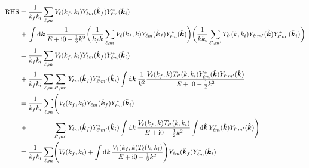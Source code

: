 \documentclass{article}
\begin{document}
\begin{alignat*}{2}
  \mathrm{RHS}
  {}={}
  &
  \dfrac{1}{k_{f} k_{i}}
  \sum_{\ell, m}
  V_{\ell}\lr{k_{f}, k_{i}}
  Y_{\ell m}\lr{\hat{\boldsymbol{k}}_{f}}
  Y_{\ell m}^{*}\lr{\hat{\boldsymbol{k}}_{i}}
  \\
  {}+{}
  &
  \int
  \dd{\boldsymbol{k}}
  \dfrac
  {
    1
  }
  {
    E
    +
    \imath 0
    -
    \tfrac{1}{2}
    k^{2}
  }
  \lr[\bigg]
  {
    \dfrac{1}{k_{f} k}
    \sum_{\ell, m}
    V_{\ell}\lr{k_{f}, k}
    Y_{\ell m}\lr{\hat{\boldsymbol{k}}_{f}}
    Y_{\ell m}^{*}\lr{\hat{\boldsymbol{k}}}
  }
  \lr[\bigg]
  {
    \dfrac{1}{k k_{i}}
    \sum_{\ell', m'}
    T_{\ell'}\lr{k, k_{i}}
    Y_{\ell' m'}\lr{\hat{\boldsymbol{k}}}
    Y_{\ell' m'}^{*}\lr{\hat{\boldsymbol{k}}_{i}}
  }
  \\
  {}={}
  &
  \dfrac{1}{k_{f} k_{i}}
  \sum_{\ell, m}
  V_{\ell}\lr{k_{f}, k_{i}}
  Y_{\ell m}\lr{\hat{\boldsymbol{k}}_{f}}
  Y_{\ell m}^{*}\lr{\hat{\boldsymbol{k}}_{i}}
  \\
  {}+{}
  &
  \dfrac{1}{k_{f} k_{i}}
  \sum_{\ell, m}
  \sum_{\ell', m'}
  Y_{\ell m}\lr{\hat{\boldsymbol{k}}_{f}}
  Y_{\ell' m'}^{*}\lr{\hat{\boldsymbol{k}}_{i}}
  \int
  \dd{\boldsymbol{k}}
  \dfrac{1}{k^{2}}
  \dfrac
  {
    V_{\ell}\lr{k_{f}, k}
    T_{\ell'}\lr{k, k_{i}}
    Y_{\ell m}^{*}\lr{\hat{\boldsymbol{k}}}
    Y_{\ell' m'}\lr{\hat{\boldsymbol{k}}}
  }
  {
    E
    +
    \imath 0
    -
    \tfrac{1}{2}
    k^{2}
  }
  \\
  {}={}
  &
  \dfrac{1}{k_{f} k_{i}}
  \sum_{\ell, m}
  \lr[\Bigg]
  {
    V_{\ell}\lr{k_{f}, k_{i}}
    Y_{\ell m}\lr{\hat{\boldsymbol{k}}_{f}}
    Y_{\ell m}^{*}\lr{\hat{\boldsymbol{k}}_{i}}
    \\
    {}+{}
    &
    \phantom
    {
      \dfrac{1}{k_{f} k_{i}}
      \sum_{\ell, m}
    }
    \sum_{\ell', m'}
    Y_{\ell m}\lr{\hat{\boldsymbol{k}}_{f}}
    Y_{\ell' m'}^{*}\lr{\hat{\boldsymbol{k}}_{i}}
    \int
    \dd{k}
    \dfrac
    {
      V_{\ell}\lr{k_{f}, k}
      T_{\ell'}\lr{k, k_{i}}
    }
    {
      E
      +
      \imath 0
      -
      \tfrac{1}{2}
      k^{2}
    }
    \int
    \dd{\hat{\boldsymbol{k}}}
    Y_{\ell m}^{*}\lr{\hat{\boldsymbol{k}}}
    Y_{\ell' m'}\lr{\hat{\boldsymbol{k}}}
  }
  \\
  {}={}
  &
  \dfrac{1}{k_{f} k_{i}}
  \sum_{\ell, m}
  \lr[\Bigg]
  {
    V_{\ell}\lr{k_{f}, k_{i}}
    +
    \int
    \dd{k}
    \dfrac
    {
      V_{\ell}\lr{k_{f}, k}
      T_{\ell}\lr{k, k_{i}}
    }
    {
      E
      +
      \imath 0
      -
      \tfrac{1}{2}
      k^{2}
    }
  }
  Y_{\ell m}\lr{\hat{\boldsymbol{k}}_{f}}
  Y_{\ell m}^{*}\lr{\hat{\boldsymbol{k}}_{i}}
\end{alignat*}
\end{document}
